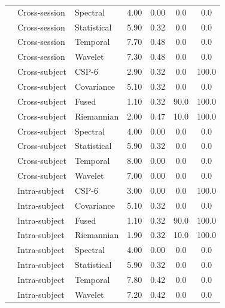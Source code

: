 \begin{table}[t]
\begin{tabular}{lllcccc}
 & Cross-session & Spectral & 4.00 & 0.00 & 0.0 & 0.0 \\
 & Cross-session & Statistical & 5.90 & 0.32 & 0.0 & 0.0 \\
 & Cross-session & Temporal & 7.70 & 0.48 & 0.0 & 0.0 \\
 & Cross-session & Wavelet & 7.30 & 0.48 & 0.0 & 0.0 \\
 & Cross-subject & CSP-6 & 2.90 & 0.32 & 0.0 & 100.0 \\
 & Cross-subject & Covariance & 5.10 & 0.32 & 0.0 & 0.0 \\
 & Cross-subject & Fused & 1.10 & 0.32 & 90.0 & 100.0 \\
 & Cross-subject & Riemannian & 2.00 & 0.47 & 10.0 & 100.0 \\
 & Cross-subject & Spectral & 4.00 & 0.00 & 0.0 & 0.0 \\
 & Cross-subject & Statistical & 5.90 & 0.32 & 0.0 & 0.0 \\
 & Cross-subject & Temporal & 8.00 & 0.00 & 0.0 & 0.0 \\
 & Cross-subject & Wavelet & 7.00 & 0.00 & 0.0 & 0.0 \\
 & Intra-subject & CSP-6 & 3.00 & 0.00 & 0.0 & 100.0 \\
 & Intra-subject & Covariance & 5.10 & 0.32 & 0.0 & 0.0 \\
 & Intra-subject & Fused & 1.10 & 0.32 & 90.0 & 100.0 \\
 & Intra-subject & Riemannian & 1.90 & 0.32 & 10.0 & 100.0 \\
 & Intra-subject & Spectral & 4.00 & 0.00 & 0.0 & 0.0 \\
 & Intra-subject & Statistical & 5.90 & 0.32 & 0.0 & 0.0 \\
 & Intra-subject & Temporal & 7.80 & 0.42 & 0.0 & 0.0 \\
 & Intra-subject & Wavelet & 7.20 & 0.42 & 0.0 & 0.0 \\
\bottomrule
\end{tabular}
\end{table}